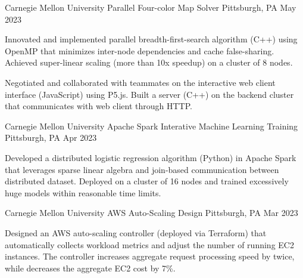 

\begin{cventries}

  \cventry
    {Carnegie Mellon University} %
    {Parallel Four-color Map Solver} %
    {Pittsburgh, PA} %
    {May 2023} %
    {
      \begin{cvitems} %
        \item {Innovated and implemented parallel breadth-first-search algorithm (C++) using OpenMP that minimizes 
        inter-node dependencies and cache false-sharing. Achieved super-linear scaling (more than 10x speedup) on 
        a cluster of 8 nodes.}
        \item {Negotiated and collaborated with teammates on the interactive web client interface (JavaScript) 
        using P5.js. Built a server (C++) on the backend cluster that communicates with web client through HTTP.}
      \end{cvitems}
    }

  \cventry
    {Carnegie Mellon University} %
    {Apache Spark Interative Machine Learning Training} %
    {Pittsburgh, PA} %
    {Apr 2023} %
    {
      \begin{cvitems} %
        \item {Developed a distributed logistic regression algorithm (Python) in Apache Spark that leverages 
        sparse linear algebra and join-based communication between distributed dataset. Deployed on a cluster 
        of 16 nodes and trained excessively huge models within reasonable time limits.}
      \end{cvitems}
    }

  \cventry
    {Carnegie Mellon University} %
    {AWS Auto-Scaling Design} %
    {Pittsburgh, PA} %
    {Mar 2023} %
    {
      \begin{cvitems} %
        \item {Designed an AWS auto-scaling controller (deployed via Terraform) that automatically 
        collects workload metrics and adjust the number of running EC2 instances. The controller 
        increases aggregate request processing speed by twice, while decreases the aggregate EC2 
        cost by 7\%.}
      \end{cvitems}
    }


\end{cventries}

